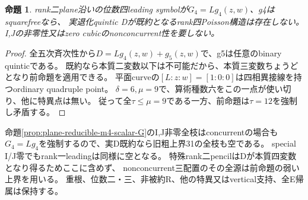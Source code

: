 \documentclass[a4paper,11pt]{ltjsarticle}
\newtheorem{proposition}{命題}[section]
\theoremstyle{definition}
\begin{document}
\begin{proposition}\label{prop:plane-m4-rankone-squarefree-empty}
rank二plane沿いの位数四leading symbolが$G_4=L g_4(z,w)$、g4はsquarefreeなら、
実退化quintic Dが既約となるrank四Poisson構造は存在しない。
I,Jの非零性又はzero cubicのnonconcurrent性を要しない。
\end{proposition}
\begin{proof}
全五次斉次性から$D=L g_4(z,w)+g_5(z,w)$で、g5は任意のbinary quinticである。
既約なら本質二変数以下は不可能だから、本質三変数ちょうどとなり前命題を適用できる。
平面curveの$[L:z:w]=[1:0:0]$は四相異接線を持つordinary quadruple point。
$\delta=6,\mu=9$で、算術種数六をこの一点が使い切り、他に特異点は無い。
従って全$\tau\le\mu=9$である一方、前命題は$\tau=12$を強制し矛盾する。
\end{proof}
命題\ref{prop:plane-reducible-m4-scalar-G}のI,J非零全枝はconcurrentの場合も
$G_4=L g_4$を強制するので、実D既約なら旧粗上界31の全枝も空である。
special I/J零でもrank一leadingは同様に空となる。
特殊rank二pencilはDが本質四変数となり得るためここに含めず、
nonconcurrent三配置のその全源は前命題の弱い上界を用いる。
重根、位数二・三、非被約R、他の特異又はvertical支持、全E帰属は保持する。
\end{document}
